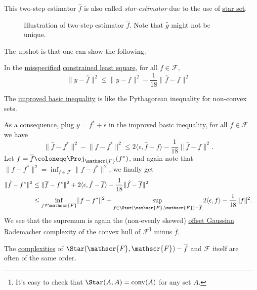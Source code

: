 This two-step estimator \(\hat{f} \) is also called \emph{star-estimator} due to the use of \hyperref[def:star-set]{star set}.

\begin{figure}[H]
	\centering
	\caption{Illustration of two-step estimator \(\hat{f} \). Note that \(\hat{g} \) might not be unique.}
	\label{fig:star-estimator}
\end{figure}

The upshot is that one can show the following.

\begin{lemma}\label{lma:improved-basic-inequality}
	In the \hyperref[def:misspecified]{misspecified} \hyperref[prb:constrained-LS]{constrained least square}, for all \(f\in \mathscr{F} \),
	\[
		\lVert y - \hat{f}  \rVert ^2 \leq \lVert y - f \rVert ^2 - \frac{1}{18} \lVert \hat{f} - f \rVert ^2
	\]
\end{lemma}

\begin{remark}
	The \hyperref[lma:improved-basic-inequality]{improved basic inequality} is like the Pythagorean inequality for non-convex sets.
\end{remark}

As a consequence, plug \(y = f^{\ast} + \epsilon \) in the \hyperref[lma:improved-basic-inequality]{improved basic inequality}, for all \(f\in \mathscr{F} \) we have
\[
	\lVert \hat{f} - f^{\ast}  \rVert ^2 - \lVert f - f^{\ast}  \rVert ^2
	\leq 2 \langle \epsilon , \hat{f} - f \rangle - \frac{1}{18} \lVert \hat{f} - f \rVert ^2.
\]
Let \(f = \overline{f} \coloneqq \Proj_{\mathscr{F} }(f^{\ast} ) \), and again note that \(\lVert \overline{f} - f^{\ast} \rVert ^2 = \inf _{f\in \mathscr{F} } \lVert f - f^{\ast} \rVert ^2\), we finally get
\[
	\begin{split}
		\lVert \hat{f} - f^{\ast} \rVert ^2
		 & \leq \lVert \overline{f} - f^{\ast} \rVert ^2 +  2 \langle \epsilon , \hat{f} - \overline{f} \rangle - \frac{1}{18} \lVert \hat{f} - \overline{f} \rVert ^2                                      \\
		 & \leq \inf _{f\in \mathscr{F} } \lVert f - f^{\ast} \rVert ^2 + \sup _{f\in \Star(\mathscr{F} , \mathscr{F} ) - \overline{f}  } 2 \langle \epsilon , f \rangle - \frac{1}{18} \lVert f \rVert ^2.
	\end{split}
\]
We see that the supremum is again the (non-evenly skewed) \hyperref[def:offset-Gaussian-Rademacher-complexity]{offset Gaussian Rademacher complexity} of the convex hull of \(\mathscr{F} \)\footnote{It's easy to check that \(\Star(A, A) = \operatorname{conv}(A) \) for any set \(A\).} minus \(\overline{f} \).

\begin{remark}
	The \hyperref[def:offset-Gaussian-Rademacher-complexity]{complexities} of \(\Star(\mathscr{F} , \mathscr{F} ) - \overline{f} \) and \(\mathscr{F} \) itself are often of the same order.
\end{remark}